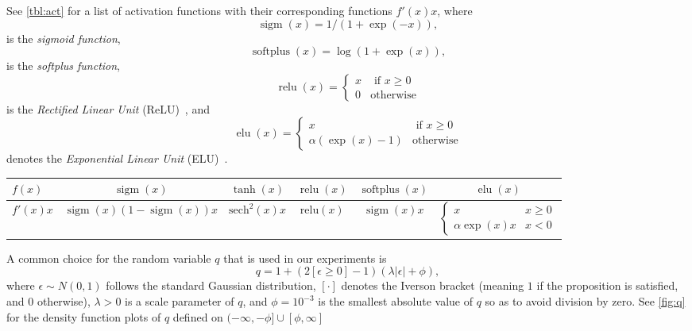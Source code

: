 \documentclass{article}
\DeclareMathOperator{\sigm}{\mathrm{sigm}}
\DeclareMathOperator{\relu}{\mathrm{relu}}
\DeclareMathOperator{\elu}{\mathrm{elu}}
\DeclareMathOperator{\softplus}{\mathrm{softplus}}
\begin{document}
See \cref{tbl:act} for a list of activation functions with their corresponding functions $f'(x)x$,
where 
$$
\sigm(x)=1/(1+\exp(-x)),
$$ 
is the {\em sigmoid function},
$$
\softplus(x)=\log(1+\exp(x)),
$$
is the {\em softplus function},
\begin{equation*}
\relu(x)=\left\{
\begin{array}{ll}
x & \text{ if }x\ge0\\
0 & \text{otherwise}
\end{array}
\right.
\end{equation*}
is the {\em Rectified Linear Unit} (ReLU)~\cite{maas13},
and
\begin{equation*}
\elu(x)=\left\{
\begin{array}{ll}
x & \text{ if }x\ge0\\
\alpha(\exp(x)-1) & \text{otherwise}
\end{array}
\right.
\end{equation*}
denotes the {\em Exponential Linear Unit} (ELU)~\cite{clevert15}.

 


\begin{table*}
\centering
\caption{Common activation functions $f(x)$ with their corresponding limit cases $\lim_{\mathrm{Var}(q)\to0}  g_q(x)=f'(x)x$.}\label{tbl:act}
\vspace{.5em}
\begin{tabular}{|l||c|c|c|c|c|}\hline
$f(x)$   & $\sigm(x)$ & $\tanh(x)$ & $\relu(x)$ & $\softplus(x)$& $\elu(x)$ \\ \hline
$f'(x)x$ & $\sigm(x)(1-\sigm(x))x$ & $\mathrm{sech}^2(x)x$ & $\mathrm{relu}(x)$ & $\sigm(x)x$ & $\left\{ \begin{array}{ll}
               x & x\ge0\\
\alpha \exp(x) x & x<0 \end{array}\right.$\\ \hline
\end{tabular}
\end{table*}


A common choice for the random variable $q$ that is used in our experiments is
\begin{equation}\label{eq:q}
q = 1 + \left(2[\epsilon\ge0]-1\right) \left(\lambda \vert\epsilon\vert + \phi\right),
\end{equation}
where $\epsilon\sim N(0,1)$ follows the standard Gaussian distribution, 
$[\cdot]$ denotes the Iverson bracket  (meaning $1$ if the proposition is satisfied, and $0$ otherwise),
$\lambda>0$ is a scale parameter of $q$, and $\phi=10^{-3}$
is the smallest absolute value of $q$ so as to avoid division by zero.
See \cref{fig:q} for the density function plots of $q$ defined on $(-\infty,-\phi]\cup[\phi,\infty]$
\end{document}
